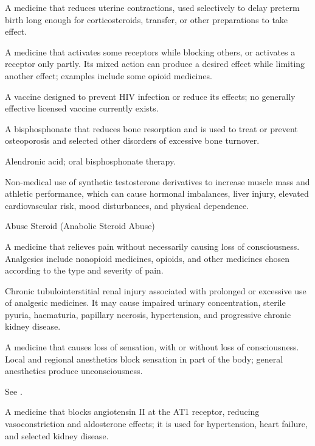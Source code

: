  A medicine that reduces uterine contractions, used selectively to delay preterm birth long enough for corticosteroids, transfer, or other preparations to take effect.

 A medicine that activates some receptors while blocking others, or activates a receptor only partly. Its mixed action can produce a desired effect while limiting another effect; examples include some opioid medicines.

 A vaccine designed to prevent HIV infection or reduce its effects; no generally effective licensed vaccine currently exists.

 A bisphosphonate that reduces bone resorption and is used to treat or prevent osteoporosis and selected other disorders of excessive bone turnover.

\synonyms
Alendronic acid; oral bisphosphonate therapy.




 Non-medical use of synthetic testosterone derivatives to increase muscle mass and athletic performance, which can cause hormonal imbalances, liver injury, elevated cardiovascular risk, mood disturbances, and physical dependence.

\synonyms
Abuse Steroid (Anabolic Steroid Abuse)

 A medicine that relieves pain without necessarily causing loss of consciousness. Analgesics include nonopioid medicines, opioids, and other medicines chosen according to the type and severity of pain.

 Chronic tubulointerstitial renal injury associated with prolonged or excessive use of
analgesic medicines. It may cause impaired urinary concentration, sterile pyuria,
haematuria, papillary necrosis, hypertension, and progressive chronic kidney disease.

 A medicine that causes loss of sensation, with or without loss of consciousness. Local and regional anesthetics block sensation in part of the body; general anesthetics produce unconsciousness.

 See .

 A medicine that blocks angiotensin II at the AT1 receptor, reducing vasoconstriction and aldosterone effects; it is used for hypertension, heart failure, and selected kidney disease.

